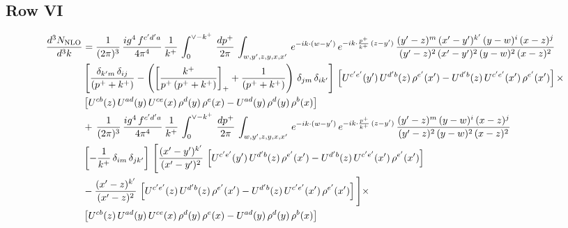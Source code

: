\documentclass[9pt]{article}
\numberwithin{equation}{section}
\begin{document}
\subsection{Row VI}
{\color{orange}\sloppy{}\par
\begin{align*}
   \frac{d^{3}N_{\rm NLO}}{d^{3}k} & = \frac{1}{(2\pi)^{3}}\, \frac{ig^{4}\,f^{c'd'a}}{4\pi^{4}}\, \frac{1}{k^{+}}\,\int_{0}^{\vee - k^{+}}\, \frac{dp^{+}}{2\pi}\, \int_{w,y',z,y,x,x'}\, e^{-ik\cdot (w-y')}\, e^{-ik\cdot \frac{p^{+}}{k^{+}}\,(z-y')}\,\frac{(y'-z)^{m}\,(x'-y')^{k'}\,(y-w)^{i}\,(x-z)^{j}}{(y'-z)^{2}\,(x'-y')^{2}\,(y-w)^{2}\,(x-z)^{2}}\notag \\ & \left[\frac{\delta_{k'm}\,\delta_{ij}}{(p^{+}+k^{+})}-\left(\left[\frac{k^{+}}{p^{+}\,(p^{+}+k^{+})}\right]_{+}+\frac{1}{(p^{+}+k^{+})}\right)\,\delta_{jm}\,\delta_{ik'}\right]\, \left[U^{c'e'}(y')\,U^{d'b}(z)\,\rho^{e'}(x')-U^{d'b}(z)\,U^{c'e'}(x')\,\rho^{e'}(x')\right]\times\notag \\ &  \left[U^{cb}(z)\,U^{ad}(y)\,U^{ce}(x)\,\rho^{d}(y)\,\rho^{e}(x)-U^{ad}(y)\,\rho^{d}(y)\,\rho^{b}(x)\right] \notag \\ & +\,\frac{1}{(2\pi)^{3}}\, \frac{ig^{4}\,f^{c'd'a}}{4\pi^{4}}\, \frac{1}{k^{+}}\,\int_{0}^{\vee - k^{+}}\, \frac{dp^{+}}{2\pi}\, \int_{w,y',z,y,x,x'}\, e^{-ik\cdot (w-y')}\, e^{-ik\cdot \frac{p^{+}}{k^{+}}\,(z-y')}\,\frac{(y'-z)^{m}\,(y-w)^{i}\,(x-z)^{j}}{(y'-z)^{2}\,(y-w)^{2}\,(x-z)^{2}}\notag \\ &  \left[-\frac{1}{k^{+}}\, \delta_{im}\, \delta_{jk'}\right]\, \Bigg[\frac{(x'-y')^{k'}}{(x'-y')^{2}}\,\left[U^{c'e'}(y')\,U^{d'b}(z)\,\rho^{e'}(x')-U^{d'b}(z)\,U^{c'e'}(x')\,\rho^{e'}(x')\right]\notag \\ & -\frac{(x'-z)^{k'}}{(x'-z)^{2}}\,\left[U^{c'e'}(z)\,U^{d'b}(z)\,\rho^{e'}(x')-U^{d'b}(z)\,U^{c'e'}(x')\,\rho^{e'}(x')\right]\Bigg]\times\notag \\ &    \left[U^{cb}(z)\,U^{ad}(y)\,U^{ce}(x)\,\rho^{d}(y)\,\rho^{e}(x)-U^{ad}(y)\,\rho^{d}(y)\,\rho^{b}(x)\right]
\end{align*}
}\par
\end{document}
